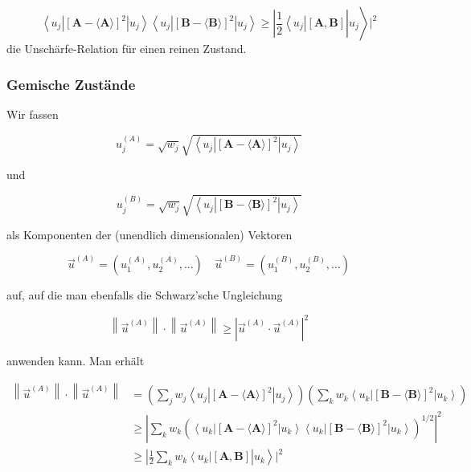 \documentclass[10pt, letterpaper]{article}
\begin{document}
$$
\left.\left\langle u_{j}\right|[\mathbf{A}-\langle\mathbf{A}\rangle]^{2}\left|u_{j}\right\rangle\left\langle u_{j}\right|[\mathbf{B}-\langle\mathbf{B}\rangle]^{2}\left|u_{j}\right\rangle \geq\left|\frac{1}{2}\left\langle u_{j}\right|[\mathbf{A}, \mathbf{B}]\right| u_{j}\right\rangle\left.\right|^{2}
$$
die Unschärfe-Relation für einen reinen Zustand.

\subsubsection*{Gemische Zustände}
Wir fassen

$$
u_{j}^{(A)}=\sqrt{w_{j}} \sqrt{\left\langle u_{j}\right|[\mathbf{A}-\langle\mathbf{A}\rangle]^{2}\left|u_{j}\right\rangle}
$$

und

$$
u_{j}^{(B)}=\sqrt{w_{j}} \sqrt{\left\langle u_{j}\right|[\mathbf{B}-\langle\mathbf{B}\rangle]^{2}\left|u_{j}\right\rangle}
$$

als Komponenten der (unendlich dimensionalen) Vektoren

$$
\vec{u}^{(A)}=\left(u_{1}^{(A)}, u_{2}^{(A)}, \ldots\right) \quad \vec{u}^{(B)}=\left(u_{1}^{(B)}, u_{2}^{(B)}, \ldots\right)
$$

auf, auf die man ebenfalls die Schwarz'sche Ungleichung

$$
\left\|\vec{u}^{(A)}\right\| \cdot\left\|\vec{u}^{(A)}\right\| \geq\left|\vec{u}^{(A)} \cdot \vec{u}^{(A)}\right|^{2}
$$

anwenden kann. Man erhält

$$
\begin{aligned}
\left\|\vec{u}^{(A)}\right\| \cdot\left\|\vec{u}^{(A)}\right\| & =\left(\sum_{j} w_{j}\left\langle u_{j}\right|[\mathbf{A}-\langle\mathbf{A}\rangle]^{2}\left|u_{j}\right\rangle\right)\left(\sum_{k} w_{k}\left\langle u_{k}\right|[\mathbf{B}-\langle\mathbf{B}\rangle]^{2}\left|u_{k}\right\rangle\right) \\
& \geq\left|\sum_{k} w_{k}\left(\left\langle u_{k}\right|[\mathbf{A}-\langle\mathbf{A}\rangle]^{2}\left|u_{k}\right\rangle\left\langle u_{k}\right|[\mathbf{B}-\langle\mathbf{B}\rangle]^{2}\left|u_{k}\right\rangle\right)^{1 / 2}\right|^{2} \\
& \left.\geq\left|\frac{1}{2} \sum_{k} w_{k}\left\langle u_{k}\right|[\mathbf{A}, \mathbf{B}]\right| u_{k}\right\rangle\left.\right|^{2}
\end{aligned}
$$
\end{document}
